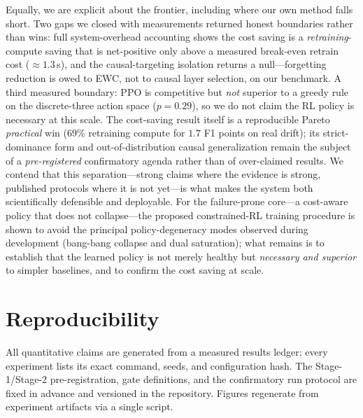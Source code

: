 \documentclass[conference]{IEEEtran}
\begin{document}
Equally, we are explicit about the frontier, including where our own method
falls short. Two gaps we closed with measurements returned honest
boundaries rather than wins: full system-overhead accounting shows the
cost saving is a \emph{retraining}-compute saving that is net-positive only
above a measured break-even retrain cost ($\approx1.3$\,s), and the
causal-targeting isolation returns a null---forgetting reduction is owed to
EWC, not to causal layer selection, on our benchmark. A third measured boundary: PPO is competitive but \emph{not} superior to a
greedy rule on the discrete-three action space ($p=0.29$), so we do not
claim the RL policy is necessary at this scale. The cost-saving result
itself is a reproducible Pareto \emph{practical} win ($69\%$ retraining
compute for $1.7$ F1 points on real drift); its strict-dominance form and
out-of-distribution causal generalization remain the subject of a
\emph{pre-registered} confirmatory agenda rather than of over-claimed
results. We contend that this separation---strong claims where the
evidence is strong, published protocols where it is not yet---is what makes
the system both scientifically defensible and deployable. For the
failure-prone core---a cost-aware policy that does not collapse---the
proposed constrained-RL training procedure is shown to avoid the principal
policy-degeneracy modes observed during development (bang-bang collapse and
dual saturation); what remains is to establish that the learned policy is
not merely healthy but \emph{necessary and superior} to simpler baselines,
and to confirm the cost saving at scale.

\section*{Reproducibility}
All quantitative claims are generated from a measured results ledger; every
experiment lists its exact command, seeds, and configuration hash. The
Stage-1/Stage-2 pre-registration, gate definitions, and the confirmatory
run protocol are fixed in advance and versioned in the repository. Figures
regenerate from experiment artifacts via a single script.



\end{document}
